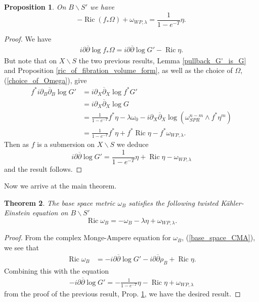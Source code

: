 \documentclass[12pt]{article}
\newtheorem{theorem}{Theorem}[section]
\newtheorem{proposition}[theorem]{Proposition}
\numberwithin{equation}{section}
\renewcommand{\d}{\partial}
\newcommand{\dbar}{\overline{\partial}}
\DeclareMathOperator{\Ric}{Ric}
\begin{document}
\begin{proposition}\label{WPL_FS_equation}
On $B\backslash S'$ we have
\begin{equation*}
    -\Ric(f_*\Omega) + \omega_{WP,\lambda} = \frac{1}{1-e^{-T}}\eta.
\end{equation*}
\end{proposition}

\begin{proof}
We have
\begin{align*}
    i\d\dbar\log f_* \Omega = i\d\dbar\log G' - \Ric \eta.
\end{align*}
But note that on $X\backslash S$ the two previous results, Lemma \ref{pullback_G'_is_G} and Proposition \ref{ric_of_fibration_volume_form}, as well as the choice of $\Omega$, (\ref{choice_of_Omega}), give
\begin{align*}
    f^*i\d_B\dbar_B \log G' &= i\d_X\dbar_X \log f^*G'\\
    &= i\d_X\dbar_X\log G\\
    &= \frac{1}{1-e^{-T}}f^*\eta - \lambda \omega_0 - i\d_X \dbar_X \log(\omega_{SPR}^{n-m} \wedge f^*\eta^m)\\
    &= \frac{1}{1-e^{-T}} f^*\eta + f^*\Ric\eta - f^*\omega_{WP,\lambda}.
\end{align*}
Then as $f$ is a submersion on $X \backslash S$ we deduce
\begin{equation*}
    i\d\dbar\log G' = \frac{1}{1-e^{-T}} \eta + \Ric \eta - \omega_{WP,\lambda}
\end{equation*}
and the result follows.
\end{proof}

\noindent Now we arrive at the main theorem.

\begin{theorem}
The base space metric $\omega_B$ satisfies the following twisted K\"ahler-Einstein equation on $B\backslash S'$
\begin{equation}\label{twisted_KE}
    \Ric \omega_B = -\omega_B -\lambda \eta + \omega_{WP,\lambda}.
\end{equation}
\end{theorem}

\begin{proof}
From the complex Monge-Ampere equation for $\omega_B$, (\ref{base_space_CMA}), we see that
\begin{align*}
    \Ric \omega_B &= -i\d\dbar  \log G' -i\d\dbar \rho_B +\Ric \eta.
\end{align*}
Combining this with the equation
\begin{align*}
    -i\d\dbar \log G' = -\frac{1}{1-e^{-T}} \eta - \Ric\eta + \omega_{WP,\lambda}
\end{align*}
from the proof of the previous result, Prop. \ref{WPL_FS_equation}, we have the desired result.
\end{proof}
\end{document}
